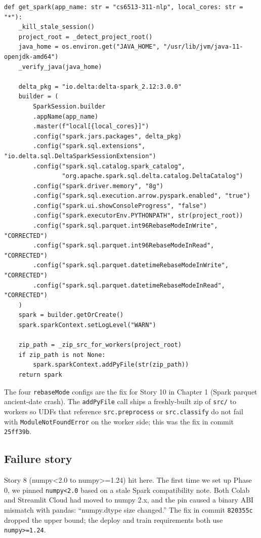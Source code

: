 \documentclass[11pt,letterpaper]{book}
\begin{document}
\begin{lstlisting}
def get_spark(app_name: str = "cs6513-311-nlp", local_cores: str = "*"):
    _kill_stale_session()
    project_root = _detect_project_root()
    java_home = os.environ.get("JAVA_HOME", "/usr/lib/jvm/java-11-openjdk-amd64")
    _verify_java(java_home)

    delta_pkg = "io.delta:delta-spark_2.12:3.0.0"
    builder = (
        SparkSession.builder
        .appName(app_name)
        .master(f"local[{local_cores}]")
        .config("spark.jars.packages", delta_pkg)
        .config("spark.sql.extensions", "io.delta.sql.DeltaSparkSessionExtension")
        .config("spark.sql.catalog.spark_catalog",
                "org.apache.spark.sql.delta.catalog.DeltaCatalog")
        .config("spark.driver.memory", "8g")
        .config("spark.sql.execution.arrow.pyspark.enabled", "true")
        .config("spark.ui.showConsoleProgress", "false")
        .config("spark.executorEnv.PYTHONPATH", str(project_root))
        .config("spark.sql.parquet.int96RebaseModeInWrite", "CORRECTED")
        .config("spark.sql.parquet.int96RebaseModeInRead", "CORRECTED")
        .config("spark.sql.parquet.datetimeRebaseModeInWrite", "CORRECTED")
        .config("spark.sql.parquet.datetimeRebaseModeInRead", "CORRECTED")
    )
    spark = builder.getOrCreate()
    spark.sparkContext.setLogLevel("WARN")

    zip_path = _zip_src_for_workers(project_root)
    if zip_path is not None:
        spark.sparkContext.addPyFile(str(zip_path))
    return spark
\end{lstlisting}

The four \texttt{rebaseMode} configs are the fix for Story 10 in Chapter 1 (Spark parquet ancient-date crash). The \texttt{addPyFile} call ships a freshly-built zip of \texttt{src/} to workers so UDFs that reference \texttt{src.preprocess} or \texttt{src.classify} do not fail with \texttt{ModuleNotFoundError} on the worker side; this was the fix in commit \texttt{25ff39b}.

\subsection*{Failure story}

Story 8 (numpy<2.0 to numpy>=1.24) hit here. The first time we set up Phase 0, we pinned \texttt{numpy<2.0} based on a stale Spark compatibility note. Both Colab and Streamlit Cloud had moved to numpy 2.x, and the pin caused a binary ABI mismatch with pandas: ``numpy.dtype size changed.'' The fix in commit \texttt{820355c} dropped the upper bound; the deploy and train requirements both use \texttt{numpy>=1.24}.
\end{document}
